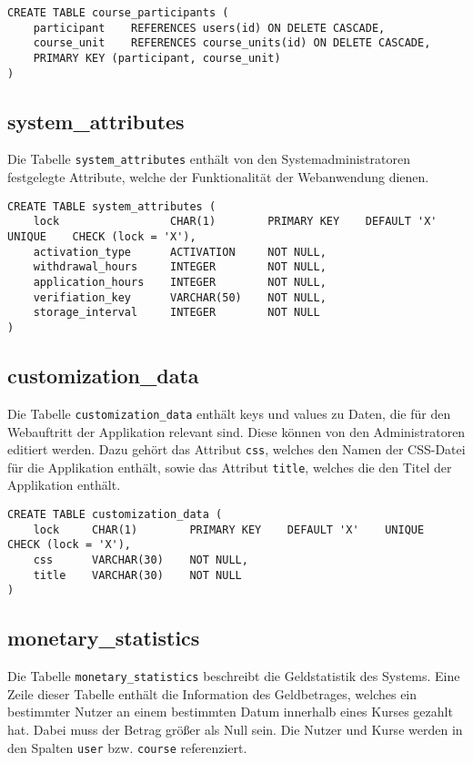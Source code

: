 \begin{verbatim}
CREATE TABLE course_participants (
    participant    REFERENCES users(id) ON DELETE CASCADE,
    course_unit    REFERENCES course_units(id) ON DELETE CASCADE,
    PRIMARY KEY (participant, course_unit)
)
\end{verbatim}

\subsection{system\_attributes}
Die Tabelle \texttt{system\_attributes} enthält von den Systemadministratoren festgelegte Attribute, welche der Funktionalität der Webanwendung dienen.

\begin{verbatim}
CREATE TABLE system_attributes (
	lock                 CHAR(1)        PRIMARY KEY    DEFAULT 'X'    UNIQUE    CHECK (lock = 'X'),
    activation_type      ACTIVATION     NOT NULL,
    withdrawal_hours     INTEGER        NOT NULL,
    application_hours    INTEGER        NOT NULL,
    verifiation_key      VARCHAR(50)    NOT NULL,
    storage_interval     INTEGER        NOT NULL
)
\end{verbatim}

\subsection{customization\_data}
Die Tabelle \texttt{customization\_data} enthält keys und values zu Daten, die für den Webauftritt der Applikation relevant sind. Diese können von den Administratoren editiert werden. Dazu gehört das Attribut \texttt{css}, welches den Namen der CSS-Datei für die Applikation enthält, sowie das Attribut \texttt{title}, welches die den Titel der Applikation enthält.

\begin{verbatim}
CREATE TABLE customization_data (
    lock     CHAR(1)        PRIMARY KEY    DEFAULT 'X'    UNIQUE    CHECK (lock = 'X'),
    css      VARCHAR(30)    NOT NULL,
    title    VARCHAR(30)    NOT NULL
)
\end{verbatim}

\subsection{monetary\_statistics}
Die Tabelle \texttt{monetary\_statistics} beschreibt die Geldstatistik des Systems. Eine Zeile dieser Tabelle enthält die Information des Geldbetrages, welches ein bestimmter Nutzer an einem bestimmten Datum innerhalb eines Kurses gezahlt hat. Dabei muss der Betrag größer als Null sein. Die Nutzer und Kurse werden in den Spalten \texttt{user} bzw. \texttt{course} referenziert.


